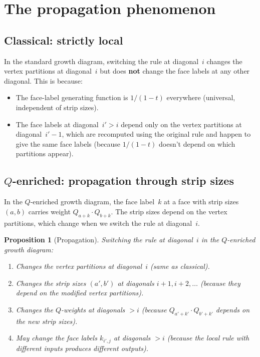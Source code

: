 \documentclass[11pt]{article}
\theoremstyle{plain}
\newtheorem{proposition}[theorem]{Proposition}
\theoremstyle{definition}
\begin{document}
\section{The propagation phenomenon}
\label{sec:propagation}

\subsection{Classical: strictly local}

In the standard growth diagram, switching the rule at
diagonal~$i$ changes the vertex partitions at diagonal~$i$
but does \textbf{not} change the face labels at any other
diagonal.  This is because:
\begin{itemize}
  \item The face-label generating function is $1/(1-t)$
    everywhere (universal, independent of strip sizes).
  \item The face labels at diagonal~$i' > i$ depend only on
    the vertex partitions at diagonal~$i'-1$, which are
    recomputed using the original rule and happen to give the
    same face labels (because $1/(1-t)$ doesn't depend on
    which partitions appear).
\end{itemize}

\subsection{$Q$-enriched: propagation through strip sizes}

In the $Q$-enriched growth diagram, the face label~$k$ at a
face with strip sizes $(a,b)$ carries weight
$Q_{a+k} \cdot Q_{b+k}$.  The strip sizes depend on the
vertex partitions, which change when we switch the rule at
diagonal~$i$.

\begin{proposition}[Propagation]
\label{prop:propagation}
Switching the rule at diagonal~$i$ in the $Q$-enriched growth
diagram:
\begin{enumerate}
  \item Changes the vertex partitions at diagonal~$i$
    (same as classical).
  \item Changes the strip sizes $(a', b')$ at diagonals
    $i+1, i+2, \ldots$ (because they depend on the modified
    vertex partitions).
  \item Changes the $Q$-weights at diagonals $> i$ (because
    $Q_{a'+k'} \cdot Q_{b'+k'}$ depends on the new strip
    sizes).
  \item May change the face labels $k_{i',j}$ at diagonals
    $> i$ (because the local rule with different inputs
    produces different outputs).
\end{enumerate}
\end{proposition}
\end{document}
